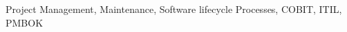 
% 
% 

\begin{keywords}

Project Management, Maintenance, Software lifecycle Processes, COBIT, ITIL, PMBOK

\end{keywords}